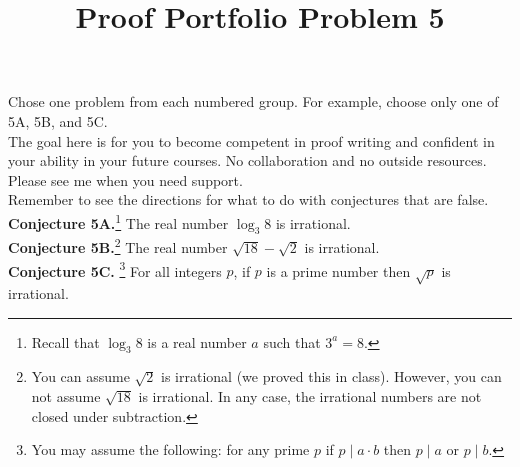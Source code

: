 \documentclass{article}  %
\title{Proof Portfolio Problem 5}
\author{}
\date{}
\begin{document}
\maketitle

Chose one problem from each numbered group.  For example, choose only one of 5A, 5B, and 5C.\\

The goal here is for you to become competent in proof writing and confident in your ability in your future courses.  No collaboration and no outside resources. Please see me when you need support.\\

Remember to see the directions for what to do with conjectures that are false.  \\




	
\noindent\textbf{Conjecture 5A.}\footnote{Recall that $\log_3 8$ is  a real number $a$ such that $3^a = 8$.}  The real number $\log_3 8$ is irrational.\\


\noindent\textbf{Conjecture 5B.}\footnote{You can assume $\sqrt{2}$ is irrational (we proved this in class). However, you can not assume $\sqrt{18}$ is irrational. In any case, the irrational numbers are not closed under subtraction.}  The real number $\sqrt{18} - \sqrt{2}$ is irrational.\\

\noindent\textbf{Conjecture 5C.} \footnote{You may assume the following: for any prime $p$ if $p\mid a\cdot b$ then $p\mid a$ or $p\mid b$.}  For all integers $p$, if $p$ is a prime number then $\sqrt{p}$ is irrational.
\end{document}
